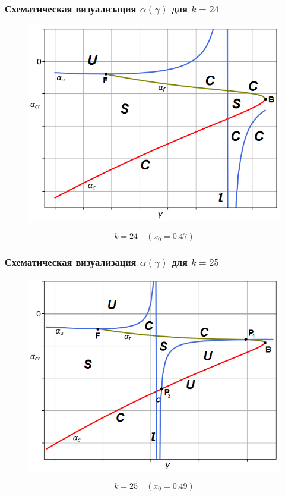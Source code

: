 \documentclass[fullscreen=true, unicode, bookmarks=false]{beamer}
\begin{document}
\begin{frame}
\frametitle{ Схематическая визуализация $ \alpha(\gamma) $ для $ k=24 $ }

\begin{figure}[h]
\includegraphics[scale=0.55]{k=24.png} 
\end{figure}

$$ k=24 \quad (x_0=0.47) $$

\end{frame}

\begin{frame}
\frametitle{ Схематическая визуализация $ \alpha(\gamma) $ для $ k=25 $ }

\begin{figure}[h]
\includegraphics[scale=0.55]{k=25.png} 
\end{figure}

$$ k=25 \quad (x_0=0.49) $$

\end{frame}
\end{document}
